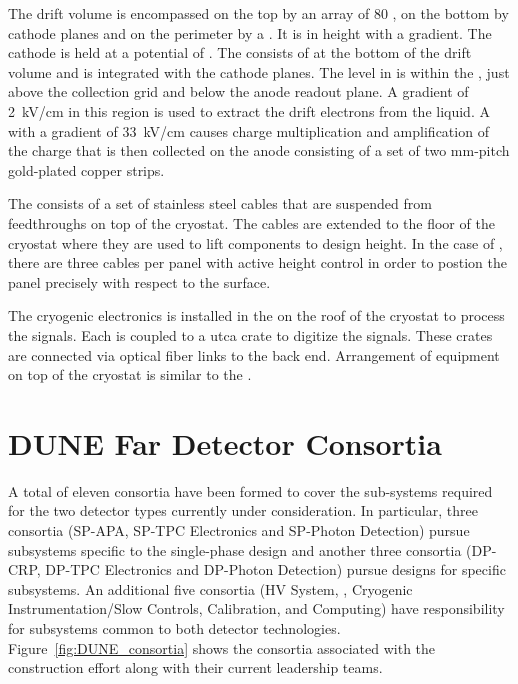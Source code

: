 The drift volume is encompassed on the top by an array of \num{80}
, on the bottom by cathode planes and on the perimeter by a 
. It is \dpmaxdrift %
in height with a
\dpnominaldriftfield %
gradient. The cathode is held at a
potential of \dptargetdriftvoltneg{}. %
The  
consists of \dpnumpmtch %
 at the bottom of the drift volume
and is integrated with the cathode planes.  
The  level in
 is within the , just above the
collection grid and below the anode readout plane. A gradient of
\SI{2}{\kilo\volt/\centi\meter} in this region is used to extract the
drift electrons from the liquid. A  with a gradient of
\SI{33}{\kilo\volt/\centi\meter} causes charge multiplication and
amplification of the charge that  is then collected on the anode 
consisting of a %
set of two \dpstrippitch\si{mm}-pitch %
gold-plated copper strips.

The   consists of a set of stainless steel
cables that are suspended from feedthroughs on top of the
cryostat. The cables are extended to the floor of the cryostat where
they are used to lift components to design height. In the case of
, there are three cables per panel with active height
control in order to postion the panel precisely with respect to the
 surface.

The cryogenic  electronics is installed in the  on the roof of the cryostat to process the
 signals. Each  is coupled to a {utca} crate to
digitize the signals. These crates are connected via optical fiber links to the 
back end. Arrangement of equipment on top of the cryostat is similar to the .

\section{DUNE Far Detector Consortia}
\label{sec:fdconsortia}

A total of eleven  consortia have been formed to cover 
the sub-systems required for the two detector types currently under
consideration.  In particular, three consortia (SP-APA, SP-TPC
Electronics and SP-Photon Detection) pursue subsystems specific to
the single-phase design and another three consortia (DP-CRP, DP-TPC
Electronics and DP-Photon Detection) pursue designs for 
specific subsystems.  An additional five consortia (HV System, ,
Cryogenic Instrumentation/Slow Controls, Calibration, and Computing)
have responsibility for subsystems common to both detector
technologies.  Figure~\ref{fig:DUNE_consortia} shows the consortia 
associated with the  construction effort along with their 
current leadership teams.  


